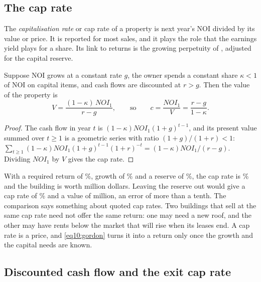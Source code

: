 \begin{chapterrefs}
\subsection{The cap rate}

The \emph{capitalisation rate} or cap rate of a property is next year's NOI divided by its value or
price. It is reported for most sales, and it plays the role that the earnings yield plays for a share. Its
link to returns is the growing perpetuity of \textcite{gordon1956}, adjusted for the capital reserve.

\begin{proposition}\label{prop10:cap}
Suppose NOI grows at a constant rate $g$, the owner spends a constant share $\kappa<1$ of NOI on capital
items, and cash flows are discounted at $r>g$. Then the value of the property is
\begin{equation}\label{eq10:gordon}
  V = \frac{(1-\kappa)\,\mathit{NOI}_1}{r-g},
  \qquad\text{so}\qquad
  c = \frac{\mathit{NOI}_1}{V} = \frac{r-g}{1-\kappa}.
\end{equation}
\end{proposition}

\begin{proof}
The cash flow in year $t$ is $(1-\kappa)\mathit{NOI}_1(1+g)^{t-1}$, and its present value summed over
$t\ge1$ is a geometric series with ratio $(1+g)/(1+r)<1$:
$\sum_{t\ge1}(1-\kappa)\mathit{NOI}_1(1+g)^{t-1}(1+r)^{-t}=(1-\kappa)\mathit{NOI}_1/(r-g)$. Dividing
$\mathit{NOI}_1$ by $V$ gives the cap rate.
\end{proof}

With a required return of \pfR\%, growth of \pfG\% and a reserve of \pfCapex\%, the cap rate is
\pfCap\% and the building is worth \pfValue{} million dollars. Leaving the reserve out would give a cap rate of
\pfCapNoCapex\% and a value of \pfValueNoCapex{} million, an error of more than a tenth. The comparison
says something about quoted cap rates. Two buildings that sell at the same cap rate need not offer the
same return: one may need a new roof, and the other may have rents below the market that will rise
when its leases end. A cap rate is a price, and \cref{eq10:gordon} turns it into a return only once
the growth and the capital needs are known.

\subsection{Discounted cash flow and the exit cap rate}


\end{chapterrefs}
